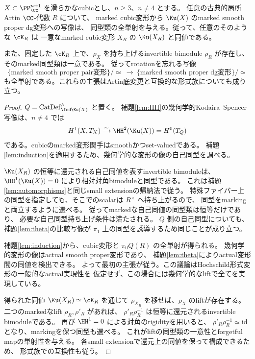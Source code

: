 \begin{theorem}[rotationを忘れた形式復元]\label{thm:unpolarized-formal}
 \(X\subset\PP^{n+1}_{\CC}\) を滑らかなcubicとし、\(n\ge3\)、\(n\ne4\) とする。
 任意の古典的局所Artin \(\CC\)-代数 \(R\) について、
 marked cubic変形から \(\Ku(X)\) のmarked smooth proper dg変形への写像は、
 同型類の全単射を与える。従って、任意のそのような \(\cK_R\) は
 一意なmarked cubic変形 \(X_R\) の \(\Ku(X_R)\) と同値である。

 また、固定した \(\cK_R\) 上で、\(\rho_X\) を持ち上げるinvertible bimodule
 \(\rho_R\) が存在し、そのmarked同型類は一意である。
 従ってrotationを忘れる写像
 \[
  \{\text{marked smooth proper pair変形}\}/\simeq
  \ \longrightarrow\
  \{\text{marked smooth proper dg変形}\}/\simeq
 \]
 も全単射である。これらの主張はArtin底変更と互換的な形式族についても成り立つ。
\end{theorem}
\begin{proof}
 \(Q=\operatorname{CatDef}_{\Ind\Ku(X)}^{\wedge}\) と置く。
 補題\ref{lem:HH}の幾何学的Kodaira--Spencer写像は、\(n\ne4\) では
 \[
  H^1(X,T_X)\xrightarrow{\sim}
  \HH^2(\Ku(X))=H^0(T_Q)
 \]
 である。cubicのmarked変形関手はsmoothかつset-valuedである。
 補題\ref{lem:induction}を適用するため、幾何学的な変形の像の自己同型を調べる。

 \(\Ku(X_R)\) の恒等に還元される自己同値を表すinvertible bimoduleは、
 \(\HH^1(\Ku(X))=0\) により相対対角bimoduleと同型である。
 これは補題\ref{lem:automorphisms}と同じsmall extensionの帰納法で従う。
 特殊ファイバー上の同型を指定しても、そこでのscalarは \(R^\times\) へ持ち上がるので、
 同型をmarkingと両立するように選べる。
 従ってmarkedな自己同値の同型類は恒等だけであり、
 必要な自己同型持ち上げ条件は満たされる。
 \(Q\) 側の自己同型についても、補題\ref{lem:theta}の比較写像が
 \(\pi_1\) 上の同型を誘導するため同じことが成り立つ。

 補題\ref{lem:induction}から、cubic変形と \(\pi_0Q(R)\) の全単射が得られる。
 幾何学的変形の像はactual smooth proper変形であり、
 補題\ref{lem:theta}によりactual変形間の同値を検出できる。
 よって最初の主張が従う。この議論はHochschild形式変形の一般的なactual実現性を
 仮定せず、この場合には幾何学的なliftで全てを実現している。

 得られた同値 \(\Ku(X_R)\simeq\cK_R\) を通じて
 \(\rho_{X_R}\) を移せば、\(\rho_X\) のliftが存在する。
 二つのmarkedなlift \(\rho_R,\rho'_R\) があれば、
 \(\rho'_R\rho_R^{-1}\) は恒等に還元されるinvertible bimoduleである。
 再び \(\HH^1=0\) による対角のrigidityを用いると、
 \(\rho'_R\rho_R^{-1}\simeq\mathrm{id}\) となり、markingを保つ同型も選べる。
 これがliftの同型類の一意性とforgetful mapの単射性を与える。
 各small extensionで還元上の同値を保って構成できるため、
 形式族での互換性も従う。
\end{proof}

